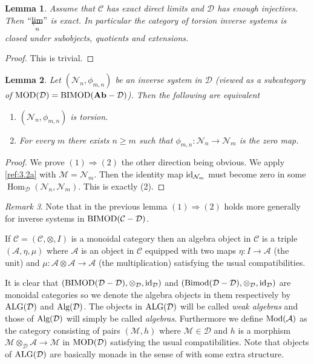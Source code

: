 \documentclass{amsproc}
\def\Ascr{{\mathcal A}}
\def\Cscr{{\mathcal C}}
\def\Dscr{{\mathcal D}}
\def\Mscr{{\mathcal M}}
\def\Nscr{{\mathcal N}}
\def\Ab{\mathbf{Ab}}
\def\Id{\text{id}}
\def\Mod{\mathop{\text{Mod}}}
\def\MOD{\mathop{\text{MOD}}}
\def\Bimod{\mathop{\text{Bimod}}}
\def\BIMOD{\mathop{\text{BIMOD}}}
\def\Alg{\mathop{\text{Alg}}}
\def\ALG{\mathop{\text{ALG}}}
\def\Hom{\operatorname {Hom}}
\def\r{\rightarrow}
\let\oldtext\text
\def\text#1{\oldtext{\upshape #1}}
\let\invlim\projlim
\newtheorem{lemmas}{Lemma}[subsection]
\theoremstyle{definition}
\theoremstyle{remark}
\newtheorem{remarks}[lemmas]{Remark}
\def\invlim{\mathop{\vtop{\baselineskip -100pt\lineskip -1pt\lineskiplimit 0pt
\setbox0\hbox{\upshape lim}\copy0\hbox to \wd0{\leftarrowfill}}}\limits}
\numberwithin{equation}{section}
\numberwithin{table}{section}
\numberwithin{figure}{section}
\begin{document}
\begin{lemmas}
  Assume that $\Cscr$ has exact direct limits and $\Dscr$ has enough
  injectives. Then $``{\invlim_n}{}"$ is exact. In particular the
  category of torsion inverse systems is closed under subobjects,
  quotients and extensions.
\end{lemmas}
\begin{proof}
This is trivial.
\end{proof}
\begin{lemmas}
\label{ref:3.1.11a}
 Let $(\Nscr_n,\phi_{m,n})$ be an inverse system in
  $\Dscr$ (viewed as a subcategory of
  $\MOD(\Dscr)=\BIMOD(\Ab-\Dscr)$). Then the following are equivalent
\begin{enumerate} 
\item
$(\Nscr_n,\phi_{m,n})$ is torsion.
\item 
For every $m$ there exists $n\ge m$ such that
$\phi_{m,n}:\Nscr_n\r\Nscr_m$ is the zero map.
\end{enumerate}
\end{lemmas}
\begin{proof}
We prove $(1)\Rightarrow (2)$ the other direction being obvious.
We apply \eqref{ref:3.2a} with $\Mscr=\Nscr_m$. Then the
identity map $\Id_{\Nscr_m}$ must become zero in some
$\Hom_{\Dscr}(\Nscr_n,\Nscr_m)$. This is exactly (2).
\end{proof}
\begin{remarks} Note that in the previous lemma $(1)\Rightarrow (2)$
   holds more generally for inverse systems in $\BIMOD(\Cscr-\Dscr)$.
\end{remarks}



\medskip


If $\Cscr=(\Cscr,\otimes, I)$ is a monoidal category \cite{ML} then an
algebra object in $\Cscr$ is a triple $(\Ascr,\eta,\mu)$ where $\Ascr$
is an object in $\Cscr$ equipped with two maps $\eta:I\r \Ascr$ (the
unit) and $\mu:\Ascr\otimes\Ascr\r\Ascr$ (the multiplication)
satisfying the usual compatibilities.


It is  clear that $(\BIMOD(\Dscr-\Dscr),\otimes_\Dscr,\Id_\Dscr)$ and 
$(\Bimod(\Dscr-\Dscr),\otimes_\Dscr,\Id_\Dscr)$ are monoidal
categories so we denote the algebra objects in them respectively by
$\ALG(\Dscr)$ and $\Alg(\Dscr)$. The objects in $\ALG(\Dscr)$ will be
called \emph{weak algebras} and those of $\Alg(\Dscr)$ will simply be
called \emph{algebras}. Furthermore we define $\Mod(\Ascr)$
as the category consisting of pairs $(\Mscr,h)$ where $\Mscr\in \Dscr$
and $h$ is a morphism $\Mscr\otimes_\Dscr\Ascr\r\Mscr$ in
$\MOD(\Dscr)$ satisfying the usual compatibilities. Note that objects of
$\ALG(\Dscr)$ are basically monads in the sense of \cite{ML} with some
extra structure.
\end{document}
